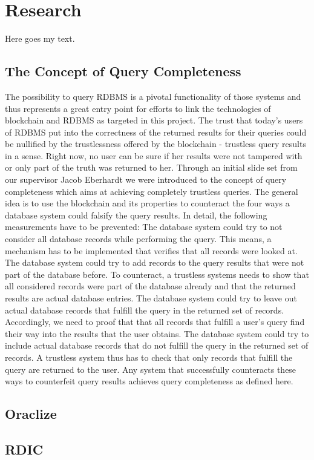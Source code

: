 \section{Research}

Here goes my text.

\subsection{The Concept of Query Completeness}
The possibility to query RDBMS is a pivotal functionality of those systems and thus represents a great entry point for efforts to link the technologies of blockchain and RDBMS as targeted in this project. The trust that today’s users of RDBMS put into the correctness of the returned results for their queries could be nullified by the trustlessness offered by the blockchain - trustless query results in a sense. Right now, no user can be sure if her results were not tampered with or only part of the truth was returned to her.
Through an initial slide set from our supervisor Jacob Eberhardt we were introduced to the concept of query completeness which aims at achieving completely trustless queries. The general idea is to use the blockchain and its properties to counteract the four ways a database system could falsify the query results. In detail, the following measurements have to be prevented:
The database system could try to not consider all database records while performing the query. This means, a mechanism has to be implemented that verifies that all records were looked at.
The database system could try to add records to the query results that were not part of the database before. To counteract, a trustless systems needs to show that all considered records were part of the database already and that the returned results are actual database entries.
The database system could try to leave out actual database records that fulfill the query in the returned set of records. Accordingly, we need to proof that that all records that fulfill a user’s query find their way into the results that the user obtains.
The database system could try to include actual database records that do not fulfill the query in the returned set of records. A trustless system thus has to check that only records that fulfill the query are returned to the user.
Any system that successfully counteracts these ways to counterfeit query results achieves query completeness as defined here.

\subsection{Oraclize}
\subsection{RDIC}
